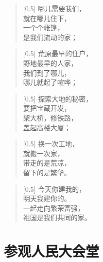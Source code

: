 \documentclass[12pt,UTF-8,openany]{ctexbook}
\begin{document}
\begin{large}
    
    \begin{verse}[0.5\linewidth]
        哪儿需要我们， \\
        就在哪儿住下， \\
        一个个帐篷， \\
        是我们流动的家；
    \end{verse}
    
    
    \begin{verse}[0.5\linewidth]
        荒原最早的住户， \\
        野地最早的人家， \\
        我们到了哪儿， \\
        哪儿就起了喧哗；
    \end{verse}
    
    
    \begin{verse}[0.5\linewidth]
        探索大地的秘密， \\
        要把宝藏开发， \\
        架大桥，修铁路， \\
        盖起高楼大厦；
    \end{verse}
    
    
    \begin{verse}[0.5\linewidth]
        换一次工地， \\
        就搬一次家， \\
        带走的是荒凉， \\
        留下的是繁华。
    \end{verse}
    
    
    \begin{verse}[0.5\linewidth]
        今天你建我的， \\
        明天我建你的。 \\
        一起走向繁荣富强， \\
        祖国是我们共同的家。
    \end{verse}
    
\end{large}



\chapter{参观人民大会堂}
\end{document}
